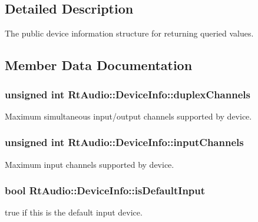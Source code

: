 \subsection{Detailed Description}
The public device information structure for returning queried values. 

\subsection{Member Data Documentation}
\subsubsection[{duplex\+Channels}]{\setlength{\rightskip}{0pt plus 5cm}unsigned int Rt\+Audio\+::\+Device\+Info\+::duplex\+Channels}\hypertarget{struct_rt_audio_1_1_device_info_a3e8ad34c2d14e24293a0beafc26186e7}{}\label{struct_rt_audio_1_1_device_info_a3e8ad34c2d14e24293a0beafc26186e7}
Maximum simultaneous input/output channels supported by device. 
\subsubsection[{input\+Channels}]{\setlength{\rightskip}{0pt plus 5cm}unsigned int Rt\+Audio\+::\+Device\+Info\+::input\+Channels}\hypertarget{struct_rt_audio_1_1_device_info_a56247b458a937ae84d98ca9c4b243275}{}\label{struct_rt_audio_1_1_device_info_a56247b458a937ae84d98ca9c4b243275}
Maximum input channels supported by device. 
\subsubsection[{is\+Default\+Input}]{\setlength{\rightskip}{0pt plus 5cm}bool Rt\+Audio\+::\+Device\+Info\+::is\+Default\+Input}\hypertarget{struct_rt_audio_1_1_device_info_a7c8aca084bd908799b6be5954b80def2}{}\label{struct_rt_audio_1_1_device_info_a7c8aca084bd908799b6be5954b80def2}
true if this is the default input device. 
